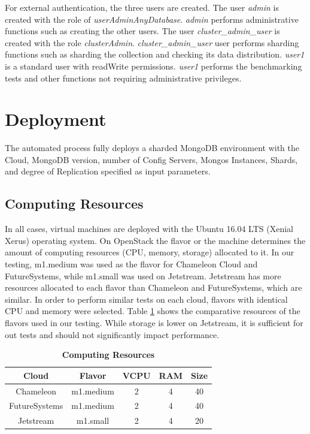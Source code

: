 \documentclass[9pt,twocolumn,twoside]{../../styles/osajnl}
\begin{document}
For external authentication, the three users are created. The user
\emph{admin} is created with the role of \emph{userAdminAnyDatabase}.
\emph{admin} performs administrative functions such as creating the
other users. The user \emph{cluster\_admin\_user} is created with the
role \emph{clusterAdmin}. \emph{cluster\_admin\_user} user performs
sharding functions such as sharding the collection and checking its
data distribution. \emph{user1} is a standard user with readWrite
permissions. \emph{user1} performs the benchmarking tests and other
functions not requiring administrative privileges.



\section{Deployment}


The automated process fully deploys a sharded MongoDB environment with
the Cloud, MongoDB version, number of Config Servers, Mongos
Instances, Shards, and degree of Replication specified as input
parameters.

\subsection{Computing Resources}

In all cases, virtual machines are deployed with the Ubuntu 16.04 LTS
(Xenial Xerus) operating system. On OpenStack the flavor or the
machine determines the amount of computing resources (CPU, memory,
storage) allocated to it. In our testing, m1.medium was used as the
flavor for Chameleon Cloud and FutureSystems, while m1.small was used
on Jetstream. Jetstream has more resources allocated to each flavor
than Chameleon and FutureSystems, which are similar. In order to
perform similar tests on each cloud, flavors with identical CPU and
memory were selected. Table \ref{tab:computing-resources} shows the
comparative resources of the flavors used in our testing. While
storage is lower on Jetstream, it is sufficient for out tests and
should not significantly impact performance.

\begin{table}[htbp]
\centering
\caption{\bf Computing Resources}

 \begin{tabular}{|c | c | c | c| c|} 
 \hline
 
Cloud &  Flavor & VCPU & RAM & Size \\ [0.5ex] 
 \hline
    
Chameleon &  m1.medium & 2 & 4 &	40 \\
 \hline
FutureSystems &  m1.medium &  2 &	4 &	40 \\ 
 \hline
Jetstream &  m1.small &  2 &	4 &	20 \\ 
\hline
\end{tabular}
  \label{tab:computing-resources}
\end{table}
\end{document}
